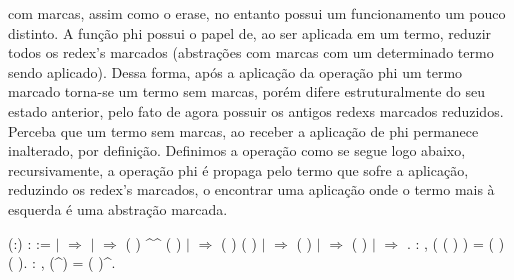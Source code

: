 com marcas, assim como o erase, no entanto possui um funcionamento um pouco distinto. A função phi
possui o papel de, ao ser aplicada em um termo, reduzir todos os redex's marcados (abstrações
com marcas com um determinado termo sendo aplicado). Dessa forma, após a aplicação da operação phi
um termo marcado torna-se um termo sem marcas, porém difere estruturalmente do seu estado anterior,
pelo fato de agora possuir os antigos redexs marcados reduzidos. Perceba que um termo sem marcas, ao
receber a aplicação de phi permanece inalterado, por definição. Definimos a operação como se segue logo
abaixo, recursivamente, a operação phi é propaga pelo termo que sofre a aplicação, reduzindo os redex's
marcados, o encontrar uma aplicação onde o termo mais à esquerda é uma abstração marcada.\begin{coqdoccode}
\coqdocemptyline
\coqdocnoindent
{}  (:) :  :=\coqdoceol
\coqdocindent{1.00em}
  \coqdoceol
\coqdocindent{1.00em}
\ensuremath{|}    \ensuremath{\Rightarrow}   \coqdoceol
\coqdocindent{11.00em}
\ensuremath{|}   \ensuremath{\Rightarrow} ( ) \^{}\^{} ( )\coqdoceol
\coqdocindent{11.00em}
\ensuremath{|} \coqdocvar{\_} \ensuremath{\Rightarrow}  ( ) ( )\coqdoceol
\coqdocindent{11.00em}
\coqdoceol
\coqdocindent{1.00em}
\ensuremath{|}   \ensuremath{\Rightarrow}  ( )\coqdoceol
\coqdocindent{1.00em}
\ensuremath{|}   \ensuremath{\Rightarrow}  ( )\coqdoceol
\coqdocindent{1.00em}
\ensuremath{|} \coqdocvar{\_} \ensuremath{\Rightarrow} \coqdoceol
\coqdocindent{1.00em}
.\coqdoceol
\coqdocemptyline
\coqdocnoindent
{} : \coqdockw{\ensuremath{\forall}}   , (  ( ) ) =   ( ) ( ).\coqdoceol
\coqdocemptyline
\coqdocnoindent
{} : \coqdockw{\ensuremath{\forall}}  , (\^{}) = ( )\^{}.\coqdoceol

\end{coqdoccode}
